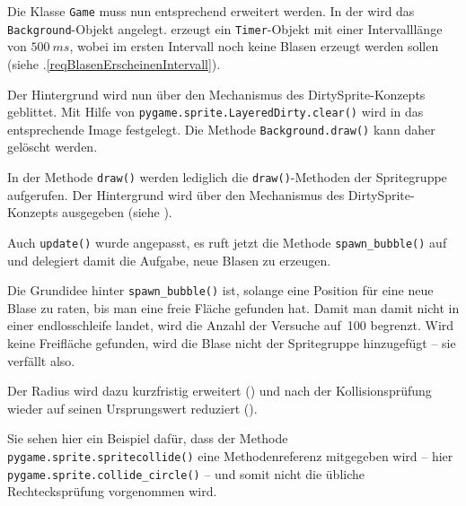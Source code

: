 
Die Klasse \texttt{Game} muss nun entsprechend erweitert werden. In der  wird das \texttt{Background}-Objekt angelegt.  erzeugt ein \texttt{Timer}-Objekt mit einer Intervalllänge von $500~ms$, wobei im ersten Intervall noch keine Blasen erzeugt werden sollen (siehe .\ref{reqBlasenErscheinenIntervall}).

Der Hintergrund wird nun über den Mechanismus des DirtySprite-Konzepts geblittet. Mit Hilfe von \texttt{pygame.sprite.LayeredDirty.clear()} wird in  das entsprechende Image festgelegt. Die Methode \texttt{Background.draw()} kann daher gelöscht werden.


In der Methode \texttt{draw()} werden lediglich die \texttt{draw()}-Methoden der Spritegruppe aufgerufen. Der Hintergrund wird über den Mechanismus des DirtySprite-Konzepts ausgegeben (siehe ). 

Auch \texttt{update()} wurde angepasst, es ruft jetzt die Methode \texttt{spawn\_bubble()} auf und delegiert damit die Aufgabe, neue Blasen zu erzeugen.


Die Grundidee hinter \texttt{spawn\_bubble()} ist, solange eine Position für eine neue Blase zu raten, bis man eine freie Fläche gefunden hat. Damit man damit nicht in einer \Gls{endlosschleife} landet, wird die Anzahl der Versuche auf~100 begrenzt. Wird keine Freifläche gefunden, wird die Blase nicht der Spritegruppe hinzugefügt -- sie verfällt also. 

Der Radius wird dazu kurzfristig erweitert () und nach der Kollisionsprüfung wieder auf seinen Ursprungswert reduziert (). 

Sie sehen hier ein Beispiel dafür, dass der Methode \texttt{pygame.sprite.spritecollide()} eine Methodenreferenz mitgegeben wird -- hier \texttt{pygame.sprite.collide\_circle()} --  und somit nicht die übliche Rechtecksprüfung vorgenommen wird.

